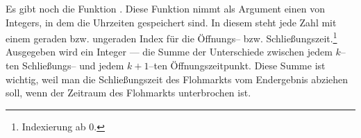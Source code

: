 Es gibt noch die Funktion . 
Diese Funktion nimmt als Argument einen  von Integers, in dem
die Uhrzeiten gespeichert sind.
In diesem  steht jede Zahl mit einem geraden bzw. ungeraden Index für die Öffnungs-- bzw. Schließungszeit.\footnote{Indexierung ab 0.} 
Ausgegeben wird ein Integer --- die Summe der Unterschiede zwischen jedem $k$--ten Schließungs--
und jedem $k+1$--ten Öffnungszeitpunkt.
Diese Summe ist wichtig, weil man die Schließungszeit des Flohmarkts vom Endergebnis abziehen soll,
wenn der Zeitraum des Flohmarkts unterbrochen ist.